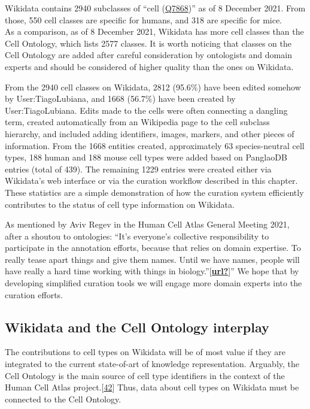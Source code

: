 Wikidata contains 2940 subclasses of ``cell (\href{https://www.wikidata.org/wiki/Q7868}{Q7868})'' as of 8 December 2021.
From those, 550 cell classes are specific for humans, and 318 are specific for mice.\\
As a comparison, as of 8 December 2021, Wikidata has more cell classes than the Cell Ontology, which lists 2577 classes.
It is worth noticing that classes on the Cell Ontology are added after careful consideration by ontologists and domain experts and should be considered of higher quality than the ones on Wikidata.

From the 2940 cell classes on Wikidata, 2812 (95.6\%) have been edited somehow by User:TiagoLubiana, and 1668 (56.7\%) have been created by User:TiagoLubiana.
Edits made to the cells were often connecting a dangling term, created automatically from an Wikipedia page to the cell subclass hierarchy, and included adding identifiers, images, markers, and other pieces of information.
From the 1668 entities created, approximately 63 species-neutral cell types, 188 human and 188 mouse cell types were added based on PanglaoDB entries (total of 439).
The remaining 1229 entries were created either via Wikidata's web interface or via the curation workflow described in this chapter.
These statistics are a simple demonstration of how the curation system efficiently contributes to the status of cell type information on Wikidata.

As mentioned by Aviv Regev in the Human Cell Atlas General Meeting 2021, after a shoutou to ontologies: ``It's everyone's collective
responsibility to participate in the annotation efforts, because that relies on domain expertise. To really tease apart things and give
them names. Until we have names, people will have really a hard time working with things in biology.''{[}\protect\hyperlink{ref-url}{\textbf{url?}}{]}''
We hope that by developing simplified curation tools we will engage more domain experts into the curation efforts.

\hypertarget{wikidata-and-the-cell-ontology-interplay}{%
\subsection{Wikidata and the Cell Ontology interplay}\label{wikidata-and-the-cell-ontology-interplay}}

The contributions to cell types on Wikidata will be of most value if they are integrated to the current state-of-art of knowledge representation.
Arguably, the Cell Ontology is the main source of cell type identifiers in the context of the Human Cell Atlas project.{[}\protect\hyperlink{ref-qT8WxqjA}{42}{]}
Thus, data about cell types on Wikidata must be connected to the Cell Ontology.

